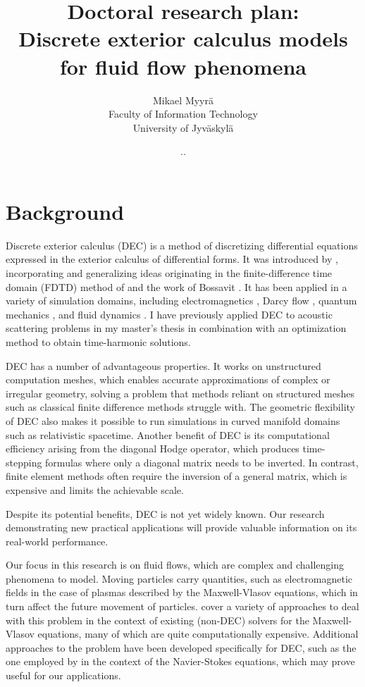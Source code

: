 \documentclass{article}
\title{Doctoral research plan: \\
Discrete exterior calculus models for fluid flow phenomena}
\author{Mikael Myyrä \\
Faculty of Information Technology \\
University of Jyväskylä}
\date{\number\day.\number\month.\number\year}
\begin{document}
\maketitle

\section*{Background}

Discrete exterior calculus (DEC) is a method of discretizing
differential equations expressed in the exterior calculus of differential forms.
It was introduced by \textcite{desbrun_discrete_2005},
incorporating and generalizing ideas originating
in the finite-difference time domain (FDTD)
method of \textcite{yee_numerical_1966} and the work of Bossavit
\parencite*{bossavit_geometry_1998,bossavit_computational_1999,
bossavit_computational_2000,bossavit_generalized_2001,bossavit_discretization_2005}.
It has been applied in a variety of simulation domains,
including electromagnetics \parencite{rabina_efficient_2015,monkola_discrete_2022},
Darcy flow \parencite{hirani_numerical_2015},
quantum mechanics \parencite{rabina_three-dimensional_2018,kivioja_evolution_2023},
and fluid dynamics \parencite{mohamed_discrete_2016,nitschke_discrete_2017}.
I have previously applied DEC to acoustic scattering problems
in my master's thesis \parencite{myyra_discrete_2023} 
in combination with an optimization method to obtain time-harmonic solutions.

DEC has a number of advantageous properties.
It works on unstructured computation meshes,
which enables accurate approximations of complex or irregular geometry,
solving a problem that methods reliant on structured meshes
such as classical finite difference methods struggle with.
The geometric flexibility of DEC also makes it possible to run simulations
in curved manifold domains such as relativistic spacetime.
Another benefit of DEC is its computational efficiency
arising from the diagonal Hodge operator,
which produces time-stepping formulas where only a diagonal matrix needs to be inverted.
In contrast, finite element methods
often require the inversion of a general matrix, which is expensive
and limits the achievable scale.

Despite its potential benefits,
DEC is not yet widely known.
Our research demonstrating new practical applications
will provide valuable information on its real-world performance.

Our focus in this research is on fluid flows,
which are complex and challenging phenomena to model.
Moving particles carry quantities, such as electromagnetic fields
in the case of plasmas described by the Maxwell-Vlasov equations,
which in turn affect the future movement of particles.
\textcite{palmroth_vlasov_2018} cover a variety of approaches to deal with this problem
in the context of existing (non-DEC) solvers for the Maxwell-Vlasov equations,
many of which are quite computationally expensive.
Additional approaches to the problem have been developed specifically for DEC,
such as the one employed by \textcite{mohamed_discrete_2016}
in the context of the Navier-Stokes equations,
which may prove useful for our applications.
\end{document}
